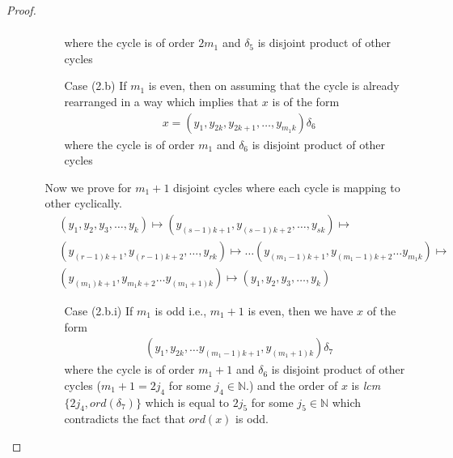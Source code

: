 \documentclass[oneside]{amsart}
\theoremstyle{plain}
\theoremstyle{definition}
\theoremstyle{remark}
\newcommand{\ord}{ord}
\begin{document}
\begin{proof}
\begin{itemize}
\begin{itemize}
\begin{itemize}
\begin{align*}
                        \end{align*} where the cycle is of order $2m_1$ and $\delta_5$ is disjoint product of other cycles
                        \item[Case (2.b)] If $m_1$ is even, then on assuming that the cycle is already rearranged in a way which implies that $x$ is of the form
                        \begin{align*}
                            x = (y_1, y_{2k}, y_{2k + 1}, \ldots , y_{m_1k})\delta_6
                        \end{align*} where the cycle is of order $m_1$ and $\delta_6$ is disjoint product of other cycles
                    \end{itemize}
                    Now we prove for $m_1 + 1$ disjoint cycles where each cycle is mapping to other cyclically.
                    \begin{align*}
                        &(y_1, y_2, y_3, \ldots , y_k) \mapsto (y_{(s- 1)k + 1}, y_{(s- 1)k + 2}, \ldots , y_{sk})\mapsto \\
                        &(y_{(r- 1)k + 1}, y_{(r- 1)k + 2}, \ldots , y_{rk})\mapsto \ldots
                        (y_{(m_1- 1)k + 1}, y_{(m_1- 1)k + 2} \ldots y_{m_1k})\mapsto\\
                        & (y_{(m_1)k + 1}, y_{m_1k + 2} \ldots y_{(m_1 + 1)k})\mapsto (y_1, y_2, y_3, \ldots , y_k)
                    \end{align*}
                    \begin{itemize}
                        \item[Case (2.b.i)] If $m_1$ is odd i.e., $m_1 + 1$ is even, then we have $x$ of the form
                        \begin{align*}
                            (y_1, y_{2k}, \ldots y_{(m_1 - 1)k + 1}, y_{(m_1 + 1)k})\delta_7
                        \end{align*}where the cycle is of order $m_1 + 1$ and $\delta_6$ is disjoint product of other cycles ($m_1 + 1 = 2j_4$ for some $j_4 \in \mathbb{N}$.) and the order of $x$ is \textit{lcm}$\{2j_4, \ord(\delta_7)\}$ which is equal to $2j_5$ for some $j_5 \in \mathbb{N}$ which contradicts the fact that $\ord(x)$ is odd.
                        

\end{itemize}
\end{itemize}
\end{itemize}
\end{proof}
\end{document}
